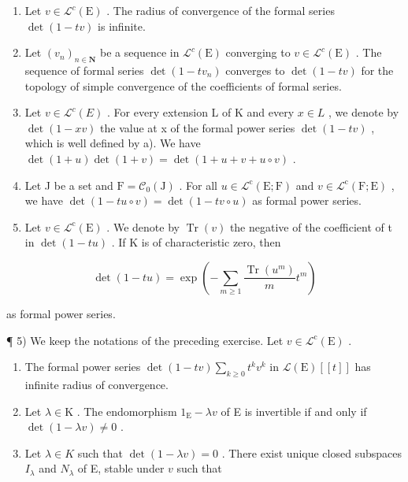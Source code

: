 \begin{enumerate}
\def\labelenumi{\alph{enumi})}
\item
  Let \(v \in \mathcal{L}^c(\mathrm{E})\) . The radius of convergence of the formal series \(\det(1 - tv)\) is infinite.
\item
  Let \((v_{n})_{n\in\mathbf{N}}\) be a sequence in \(\mathcal{L}^{c}(\mathrm{E})\) converging to \(v\in\mathcal{L}^{c}(\mathrm{E})\) . The sequence of formal series \(\det(1-tv_{n})\) converges to \(\det(1-tv)\) for the topology of simple convergence of the coefficients of formal series.
\item
  Let \(v \in \mathcal{L}^{c}(E)\) . For every extension L of K and every \(x \in L\) , we denote by \(\det(1 - xv)\) the value at x of the formal power series \(\det(1 - tv)\) , which is well defined by a). We have \(\det(1 + u)\det(1 + v) = \det(1 + u + v + u \circ v)\) .
\item
  Let J be a set and \(\mathrm{F} = \mathcal{C}_{0}(\mathrm{J})\) . For all \(u \in \mathcal{L}^{\mathrm{c}}(\mathrm{E};\mathrm{F})\) and \(v \in \mathcal{L}^{\mathrm{c}}(\mathrm{F};\mathrm{E})\) , we have \(\det(1 - tu \circ v) = \det(1 - tv \circ u)\) as formal power series.
\item
  Let \(v \in \mathcal{L}^{\mathrm{c}}(\mathrm{E})\) . We denote by \(\operatorname{Tr}(v)\) the negative of the coefficient of t in \(\det(1 - tu)\) . If K is of characteristic zero, then
\end{enumerate}

\[
\det (1 - t u) = \exp \left(- \sum_ {m \geqslant 1} \frac {\operatorname{Tr} \left(u ^ {m}\right)}{m} t ^ {m}\right)
\]

as formal power series.

¶ 5) We keep the notations of the preceding exercise. Let \(v \in \mathcal{L}^{\mathrm{c}}(\mathrm{E})\) .

\begin{enumerate}
\def\labelenumi{\alph{enumi})}
\item
  The formal power series \(\det(1 - tv)\sum_{k\geqslant 0}t^{k}v^{k}\) in \(\mathcal{L}(\mathrm{E})[[t]]\) has infinite radius of convergence.
\item
  Let \(\lambda \in \mathrm{K}\) . The endomorphism \(1_{\mathrm{E}} - \lambda v\) of E is invertible if and only if \(\det(1 - \lambda v) \neq 0\) .
\item
  Let \(\lambda \in K\) such that \(\det(1 - \lambda v) = 0\) . There exist unique closed subspaces \(I_{\lambda}\) and \(N_{\lambda}\) of E, stable under \(v\) such that
\end{enumerate}

